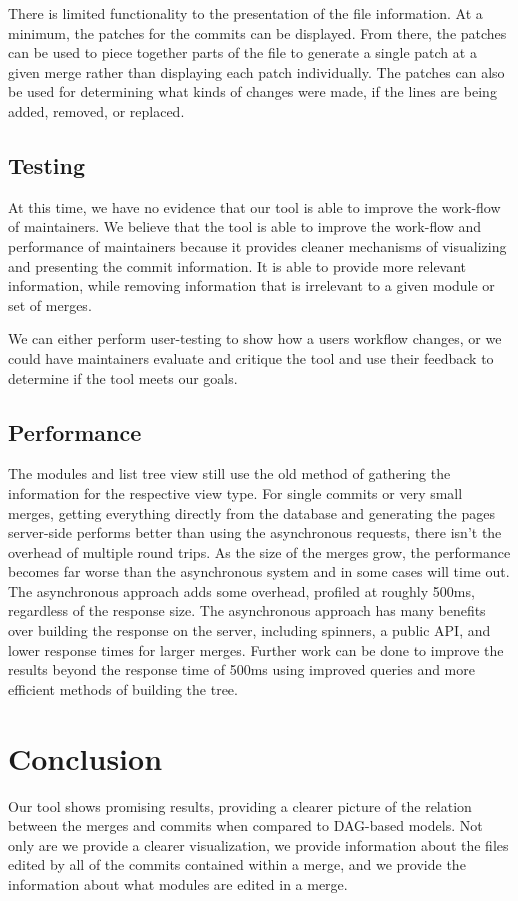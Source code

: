 \documentclass[conference, draftclsnofoot]{IEEEtran}
\begin{document}
There is limited functionality to the presentation of the file information. At
a minimum, the patches for the commits can be displayed. From there, the
patches can be used to piece together parts of the file to generate a single
patch at a given merge rather than displaying each patch individually. The
patches can also be used for determining what kinds of changes were made, if
the lines are being added, removed, or replaced.

\subsection{Testing}
At this time, we have no evidence that our tool is able to improve the
work-flow of maintainers. We believe that the tool is able to improve the
work-flow and performance of maintainers because it provides cleaner mechanisms
of visualizing and presenting the commit information. It is able to provide
more relevant information, while removing information that is irrelevant to a
given module or set of merges.

We can either perform user-testing to show how a users workflow changes, or we
could have maintainers evaluate and critique the tool and use their feedback to
determine if the tool meets our goals.

\subsection{Performance}
The modules and list tree view still use the old method of gathering the
information for the respective view type. For single commits or very small
merges, getting everything directly from the database and generating the pages
server-side performs better than using the asynchronous requests, there
isn't the overhead of multiple round trips. As the size of the merges grow,
the performance becomes far worse than the asynchronous system and in some
cases will time out. The asynchronous approach adds some overhead, profiled at
roughly 500ms, regardless of the response size. The asynchronous approach has
many benefits over building the response on the server, including spinners, a
public API, and lower response times for larger merges. Further work can be
done to improve the results beyond the response time of 500ms using improved
queries and more efficient methods of building the tree.\newpage
\section{Conclusion}
Our tool shows promising results, providing a clearer picture of the relation
between the merges and commits when compared to DAG-based models. Not only are
we provide a clearer visualization, we provide information about the files
edited by all of the commits contained within a merge, and we provide the
information about what modules are edited in a merge.
\end{document}
